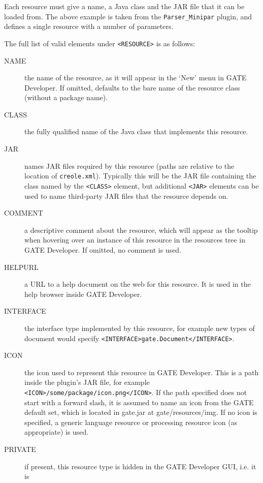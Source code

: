 
Each resource must give a name, a Java class and the JAR file that it can be
loaded from.
The above example is taken from the {\tt Parser\_Minipar} plugin, and defines a
single resource with a number of parameters.

The full list of valid elements under \verb|<RESOURCE>| is as follows:

\begin{description}
\item[NAME] the name of the resource, as it will appear in the `New'
  menu in GATE Developer.  If omitted, defaults to the bare name of
  the resource class (without a package name).
\item[CLASS] the fully qualified name of the Java class that implements this
  resource.
\item[JAR] names JAR files required by this resource (paths are relative to the
  location of {\tt creole.xml}).  Typically this will be the JAR file
  containing the class named by the \verb|<CLASS>| element, but additional
  \verb|<JAR>| elements can be used to name third-party JAR files that the
  resource depends on.
\item[COMMENT] a descriptive comment about the resource, which will
  appear as the tooltip when hovering over an instance of this resource in the
  resources tree in GATE Developer.  If omitted, no comment is used.
\item[HELPURL] a URL to a help document on the web for this resource. It is
  used in the help browser inside GATE Developer.
\item[INTERFACE] the interface type implemented by this resource, for example
  new types of document would specify \verb|<INTERFACE>gate.Document</INTERFACE>|.
\item[ICON] the icon used to represent this resource in GATE Developer.  This is
  a path inside the plugin's JAR file, for
  example \verb|<ICON>/some/package/icon.png</ICON>|.  If the path
  specified does not start with a forward slash, it is assumed to name
  an icon from the GATE default set, which is located in gate.jar at
  gate/resources/img.  If no icon is specified, a generic language
  resource or processing resource icon (as appropriate) is used.
\item[PRIVATE] if present, this resource type is hidden in the GATE Developer GUI, i.e. it is

\end{description}
